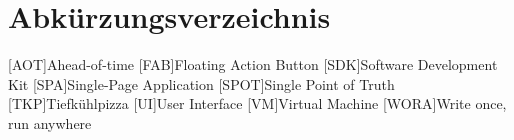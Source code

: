 \section*{Abkürzungsverzeichnis}
\begin{acronym}[xxxxxxx]\itemsep0pt
    [AOT]{Ahead-of-time}
    [FAB]{Floating Action Button}
    [SDK]{Software Development Kit }
    [SPA]{Single-Page Application}
    [SPOT]{Single Point of Truth}
    [TKP]{Tiefkühlpizza}
    [UI]{User Interface}
    [VM]{Virtual Machine}
    [WORA]{Write once, run anywhere}
\end{acronym}
